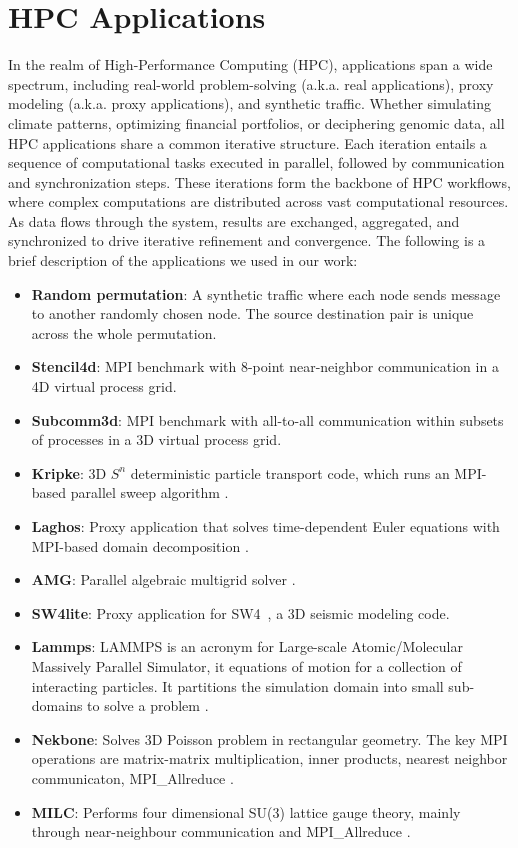 \section{HPC Applications}
In the realm of High-Performance Computing (HPC), applications span a wide spectrum, including real-world problem-solving (a.k.a. real applications), proxy modeling (a.k.a. proxy applications), and synthetic traffic. Whether simulating climate patterns, optimizing financial portfolios, or deciphering genomic data, all HPC applications share a common iterative structure. Each iteration entails a sequence of computational tasks executed in parallel, followed by communication and synchronization steps. These iterations form the backbone of HPC workflows, where complex computations are distributed across vast computational resources. As data flows through the system, results are exchanged, aggregated, and synchronized to drive iterative refinement and convergence.
The following is a brief description of the applications we used in our work:

\begin{itemize}
\item \textbf{Random permutation}: A synthetic traffic where each node sends message to another randomly chosen node. The source destination pair is unique across the whole permutation.
\item \textbf{Stencil4d}: MPI benchmark with 8-point near-neighbor communication in a 4D virtual process grid.
\item \textbf{Subcomm3d}: MPI benchmark with all-to-all communication within subsets of processes in a 3D virtual process grid.
\item \textbf{Kripke}: 3D $S^n$ deterministic particle transport code, which runs an MPI-based parallel sweep algorithm \cite{kripke}. 
\item \textbf{Laghos}: Proxy application that solves time-dependent Euler equations with MPI-based domain decomposition \cite{laghos}.
\item \textbf{AMG}:  Parallel algebraic multigrid solver \cite{amg}.
\item \textbf{SW4lite}: Proxy application for SW4~\cite{sjogreen2018sw4}, a 3D seismic modeling code.
\item \textbf{Lammps}: LAMMPS is an acronym for Large-scale Atomic/Molecular Massively Parallel Simulator, it equations of motion for a collection of interacting particles. It partitions the simulation domain into small sub-domains to solve a problem \cite{thompson2022lammps}.
\item \textbf{Nekbone}: Solves 3D Poisson problem in rectangular geometry. The key MPI operations are matrix-matrix multiplication, inner products, nearest neighbor communicaton, MPI\_Allreduce \cite{gong2016nekbone}.
\item \textbf{MILC}: Performs four dimensional SU(3) lattice gauge theory, mainly through near-neighbour communication and MPI\_Allreduce \cite{gottlieb2001benchmarking}.
\end{itemize}

